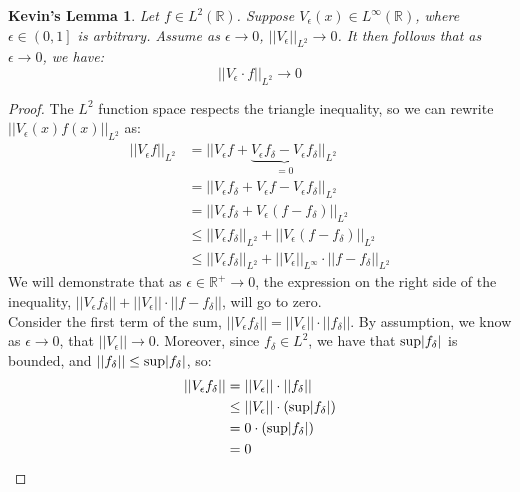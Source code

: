 \documentclass{article}
\theoremstyle{plain}
\newtheorem*{math496*}{Kevin's Lemma}
\begin{document}
\begin{math496*}

\noindent Let $ f \in L^{2} \left(\mathbb{R}\right) $. Suppose $ V_{\epsilon} \left(x\right) \in L^{\infty} \left(\mathbb{R}\right) $, where $ \epsilon \in \left(0,1\right] $ is arbitrary. Assume as $ \epsilon \to 0 $, $ || V_{\epsilon} ||_{L^{2}} \to 0 $. It then follows that as $ \epsilon \to 0 $, we have:
$$ || V_{\epsilon} \cdot f ||_{L^{2}} \to 0 $$

\end{math496*}


\begin{proof} The $ L^{2} $ function space respects the triangle inequality, so we can rewrite $ || V_{\epsilon} \left(x\right) f\left(x\right) ||_{L^{2}} $ as:
\begin{align*}
|| V_{\epsilon} f ||_{L^{2}} & = || V_{\epsilon} f + \underbrace{V_{\epsilon}f_{\delta}-V_{\epsilon}f_{\delta}}_{=0}||_{L^{2}} \\
& = || V_{\epsilon}f_{\delta} + V_{\epsilon}f - V_{\epsilon}f_{\delta} ||_{L^{2}} \\
& = || V_{\epsilon}f_{\delta} + V_{\epsilon}\left(f-f_{\delta}\right)||_{L^{2}} \\
& \leq || V_{\epsilon}f_{\delta}||_{L^{2}} + ||V_{\epsilon}\left(f-f_{\delta}\right)||_{L^{2}} \\
& \leq || V_{\epsilon} f_{\delta} ||_{L^{2}} + ||V_{\epsilon}||_{L^{\infty}} \cdot ||f-f_{\delta}|| _{L^{2}}
\end{align*}
We will demonstrate that as $ \epsilon \in \mathbb{R}^{+}  \to 0 $, the expression on the right side of the inequality, $  || V_{\epsilon} f_{\delta} || + || V_{\epsilon} || \cdot || f - f_{\delta} || $, will go to zero. \\

\noindent Consider the first term of the sum, $ || V_{\epsilon} f_{\delta} || = || V_{\epsilon} || \cdot || f_{\delta} || $. By assumption, we know  as $ \epsilon \to 0 $, that $ ||V_{\epsilon}|| \to 0 $. Moreover, since $ f_{\delta} \in L^{2} $, we have that $ \text{\rm{sup}} | f_{\delta} | $ is bounded, and $ || f_{\delta} || \leq \text{\rm{sup}}|f_{\delta}| $, so:
\begin{align*}
|| V_{\epsilon} f_{\delta} || & = || V_{\epsilon} || \cdot || f_{\delta} || \\
& \leq || V_{\epsilon} || \cdot \left( \text{\rm{sup}} |f_{\delta}| \right) \\
& = 0 \cdot \left( \text{\rm{sup}}|f_{\delta}|\right) \\
& = 0
\end{align*}


\end{proof}
\end{document}
